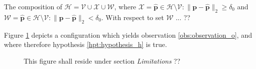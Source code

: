 \begin{remark}
  \label{rem:remark_1}
  The composition of
  $\mathcal{H} = \mathcal{V} \cup \mathcal{X} \cup \mathcal{W}$, where
  $\mathcal{X} = \hat{\bm{p}} \in {\mathcal{H} \setminus \mathcal{V}}: \|\bm{p}-\hat{\bm{p}}\|_2 \geq \delta_0$ and
  $\mathcal{W} = \hat{\bm{p}} \in {\mathcal{H} \setminus \mathcal{V}}: \|\bm{p}-\hat{\bm{p}}\|_2 < \delta_0$.
  With respect to set $\mathcal{W}$ ... ??
\end{remark}


Figure \ref{fig:h_fig1} depicts a configuration which yields observation
\ref{obs:observation_o}, and where therefore hypothesis \ref{hpt:hypothesis_h}
is true.


\begin{figure}
  
  \vspace{1cm}
  \caption{\small }
  \label{fig:h_fig1}
\end{figure}

\begin{figure}
  
  \vspace{1cm}
  \caption{\small This figure shall reside under section \textit{Limitations} ??}
  \label{fig:h_not_fig1}
\end{figure}


\begin{figure}[]\centering
  
  \caption{\small }
  \label{fig:cbgl}
\end{figure}


\begin{figure}[]\centering
  
  \caption{\small }
  \label{fig:cbgl}
\end{figure}




\lipsum[0-6]

